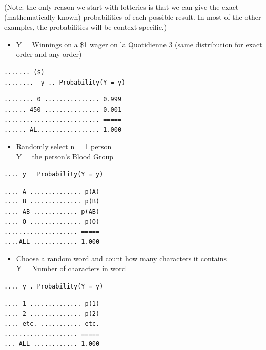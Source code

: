 \documentclass[]{book}
\providecommand{\tightlist}{%
  \setlength{\itemsep}{0pt}\setlength{\parskip}{0pt}}
\begin{document}
(Note: the only reason we start with lotteries is that we can give the exact (mathematically-known) probabilities of each possible result. In most of the other examples, the probabilities will be context-specific.)

\begin{itemize}
\tightlist
\item
  Y = Winnings on a \$1 wager on la Quotidienne 3
  (same distribution for exact order and any order)
\end{itemize}

\texttt{.......\ (\$)}\\
\texttt{........\ \ y\ ..\ Probability(Y\ =\ y)}

\texttt{........\ 0\ ...............\ 0.999}~\\
\texttt{......\ 450\ ...............\ 0.001}~\\
\texttt{..........................\ =====}~\\
\texttt{......\ AL.................\ 1.000}

\begin{itemize}
\tightlist
\item
  Randomly select n = 1 person\\
  Y = the person's Blood Group
\end{itemize}

\texttt{....\ y\ \ \ Probability(Y\ =\ y)}

\texttt{....\ A\ ..............\ p(A)}\\
\texttt{....\ B\ ..............\ p(B)}~\\
\texttt{....\ AB\ ............\ p(AB)}~\\
\texttt{....\ O\ ..............\ p(O)}~\\
\texttt{....................\ =====}~\\
\texttt{....ALL\ ............\ 1.000}

\begin{itemize}
\tightlist
\item
  Choose a random word and count how many characters it contains\\
  Y = Number of characters in word
\end{itemize}

\texttt{....\ y\ .\ Probability(Y\ =\ y)}

\texttt{....\ 1\ ..............\ p(1)}\\
\texttt{....\ 2\ ..............\ p(2)}~\\
\texttt{....\ etc.\ ...........\ etc.}~\\
\texttt{....................\ =====}~\\
\texttt{...\ ALL\ ............\ 1.000}
\end{document}
